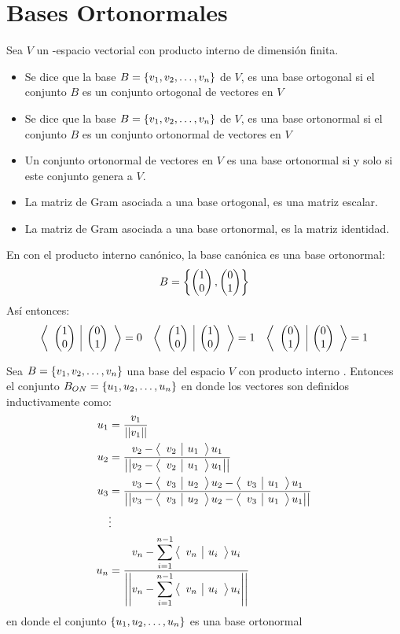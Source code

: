 \section{Bases Ortonormales}
\begin{dfn}
Sea $V$ un \dobleK-espacio vectorial con producto interno de dimensión finita.
\begin{itemize}
    \item Se dice que la base $B =  \lbrace v_1, v_2, \ldots, v_n \rbrace$ de $V$, es una base ortogonal si el conjunto $B$ es un conjunto ortogonal de vectores en $V$
    \item Se dice que la base $B =  \lbrace v_1, v_2, \ldots, v_n \rbrace$ de $V$, es una base ortonormal si el conjunto $B$ es un conjunto ortonormal de vectores en $V$
\end{itemize}
\end{dfn}
\begin{obs}
    \begin{itemize}
        \item Un conjunto ortonormal de vectores en $V$ es una base ortonormal si y solo si este conjunto genera a $V$.
        \item La matriz de Gram asociada a una base ortogonal, es una matriz escalar.
        \item La matriz de Gram asociada a una base ortonormal, es la matriz identidad.
    \end{itemize}
    
\end{obs}
\begin{ejemplo}
    En \rdos con el producto interno canónico, la base canónica es una base ortonormal:
    $$B =  \left\{\begin{pmatrix} 1\\ 0\\ \end{pmatrix} , \begin{pmatrix} 0\\ 1\\ \end{pmatrix}  \right\} $$
    Así entonces:
    \begin{align*}
        \left\langle \begin{array}{c|c} \begin{pmatrix} 1\\ 0\\ \end{pmatrix}  & \begin{pmatrix} 0\\ 1\\ \end{pmatrix}  \end{array}\right\rangle = 0&&
        \left\langle \begin{array}{c|c} \begin{pmatrix} 1\\ 0\\ \end{pmatrix}  & \begin{pmatrix} 1\\ 0\\ \end{pmatrix}  \end{array}\right\rangle = 1&&
        \left\langle \begin{array}{c|c} \begin{pmatrix} 0\\ 1\\ \end{pmatrix}  & \begin{pmatrix} 0\\ 1\\ \end{pmatrix}  \end{array}\right\rangle = 1
    \end{align*}
\end{ejemplo}

\begin{theorem}
    Sea $B= \lbrace v_1, v_2, \ldots, v_n \rbrace$ una base del espacio $V$ con producto interno \prodInt{\cdot}{\cdot}. Entonces el conjunto $B_{ON} =  \lbrace u_1, u_2, \ldots, u_n \rbrace$ en donde los vectores  son definidos inductivamente como:
    \begin{align*}
        u_1 &= \frac{v_1}{\left|\left| v_1 \right|\right|}\\
        u_2 &= \frac{v_2 - \left\langle \begin{array}{c|c} v_2 & u_1 \end{array}\right\rangle u_1}{\left|\left| v_2 - \left\langle \begin{array}{c|c} v_2 & u_1 \end{array}\right\rangle u_1 \right|\right|}\\
        u_3 &= \frac{v_3 - \left\langle \begin{array}{c|c} v_3 & u_2 \end{array}\right\rangle u_2 - \left\langle \begin{array}{c|c} v_3 & u_1 \end{array}\right\rangle u_1}{\left|\left| v_3 - \left\langle \begin{array}{c|c} v_3 & u_2 \end{array}\right\rangle u_2 - \left\langle \begin{array}{c|c} v_3 & u_1 \end{array}\right\rangle u_1 \right|\right|}\\
        & \vdots\\
        u_n &= \frac{v_n - \displaystyle \sum_{i=1}^{n-1}\left\langle \begin{array}{c|c} v_n & u_i \end{array}\right\rangle u_i}{\left|\left| v_n - \displaystyle \sum_{i=1}^{n-1}\left\langle \begin{array}{c|c} v_n & u_i \end{array}\right\rangle u_i \right|\right|}
    \end{align*}
    en donde el conjunto $ \lbrace u_1, u_2, \ldots, u_n \rbrace$ es una base ortonormal
\end{theorem}

